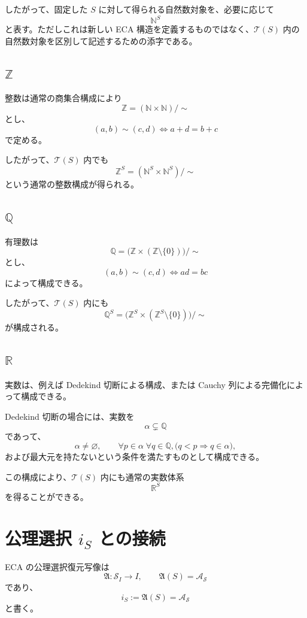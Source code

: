 \documentclass[a4paper,11pt]{article}
\newcommand{\N}{\mathbb{N}}
\newcommand{\Z}{\mathbb{Z}}
\newcommand{\Q}{\mathbb{Q}}
\newcommand{\R}{\mathbb{R}}
\begin{document}
したがって、固定した $S$ に対して得られる自然数対象を、必要に応じて
\[
\N^S
\]
と表す。ただしこれは新しい ECA 構造を定義するものではなく、$\mathcal{T}(S)$ 内の自然数対象を区別して記述するための添字である。

\subsection{$\Z$}

整数は通常の商集合構成により
\[
\Z
=
(\N\times\N)/\sim
\]
とし、
\[
(a,b)\sim(c,d)
\iff
 a+d=b+c
\]
で定める。

したがって、$\mathcal{T}(S)$ 内でも
\[
\Z^S
=(\N^S\times\N^S)/\sim
\]
という通常の整数構成が得られる。

\subsection{$\Q$}

有理数は
\[
\Q
=
\bigl(\Z\times(\Z\setminus\{0\})\bigr)/\sim
\]
とし、
\[
(a,b)\sim(c,d)
\iff
ad=bc
\]
によって構成できる。

したがって、$\mathcal{T}(S)$ 内にも
\[
\Q^S
=
\bigl(\Z^S\times(\Z^S\setminus\{0\})\bigr)/\sim
\]
が構成される。

\subsection{$\R$}

実数は、例えば Dedekind 切断による構成、または Cauchy 列による完備化によって構成できる。

Dedekind 切断の場合には、実数を
\[
\alpha\subsetneq\Q
\]
であって、
\[
\alpha\neq\varnothing,
\qquad
\forall p\in\alpha\;\forall q\in\Q,
\bigl(q<p\Rightarrow q\in\alpha\bigr),
\]
および最大元を持たないという条件を満たすものとして構成できる。

この構成により、$\mathcal{T}(S)$ 内にも通常の実数体系
\[
\R^S
\]
を得ることができる。

\section{公理選択 $i_S$ との接続}

ECA の公理選択復元写像は
\[
\mathfrak{A}:\mathcal{S}_I\to I,
\qquad
\mathfrak{A}(S)=\mathcal{A_S}
\]
であり、
\[
i_S:=\mathfrak{A}(S)=\mathcal{A_S}
\]
と書く。
\end{document}
